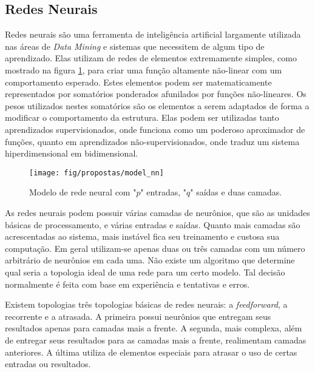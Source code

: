 \documentclass[11pt,a4paper,oneside]{book}
\begin{document}
\subsection{Redes Neurais}
Redes neurais s\~ao uma ferramenta de inteligência artificial largamente utilizada nas \'areas de \textit{Data Mining} e sistemas que necessitem de algum tipo de aprendizado.
Elas utilizam de redes de elementos extremamente simples, como mostrado na figura \ref{fig:nn}, para criar uma fun\c{c}\~ao altamente n\~ao-linear com um comportamento esperado.
Estes elementos podem ser matematicamente representados por somat\'orios ponderados afunilados por fun\c{c}\~oes n\~ao-lineares.
Os pesos utilizados nestes somat\'orios s\~ao os elementos a serem adaptados de forma a modificar o comportamento da estrutura.
Elas podem ser utilizadas tanto aprendizados supervisionados, onde funciona como um poderoso aproximador de fun\c{c}\~oes, quanto em aprendizados n\~ao-supervisionados, onde traduz um sistema hiperdimensional em bidimensional.

\begin{figure}[h]
\centering
\texttt{[image: fig/propostas/model\_nn]}
\caption{Modelo de rede neural com "$p$" entradas, "$q$" saídas e duas camadas.}
\label{fig:nn}
\end{figure}

As redes neurais podem possuir v\'arias camadas de neur\^onios, que s\~ao as unidades b\'asicas de processamento, e v\'arias entradas e saídas.
Quanto mais camadas s\~ao acrescentadas ao sistema, mais inst\'avel fica seu treinamento e custosa sua computa\c{c}\~ao.
Em geral utilizam-se apenas duas ou três camadas com um n\'umero arbitr\'ario de neur\^onios em cada uma.
N\~ao existe um algoritmo que determine qual seria a topologia ideal de uma rede para um certo modelo.
Tal decis\~ao normalmente \'e feita com base em experiência e tentativas e erros.

Existem topologias três topologias b\'asicas de redes neurais: a \textit{feedforward}, a recorrente e a atrasada.
A primeira possui neur\^onios que entregam seus resultados apenas para camadas mais a frente.
A segunda, mais complexa, al\'em de entregar seus resultados para as camadas mais a frente, realimentam camadas anteriores.
A \'ultima utiliza de elementos especiais para atrasar o uso de certas entradas ou resultados.
\end{document}
